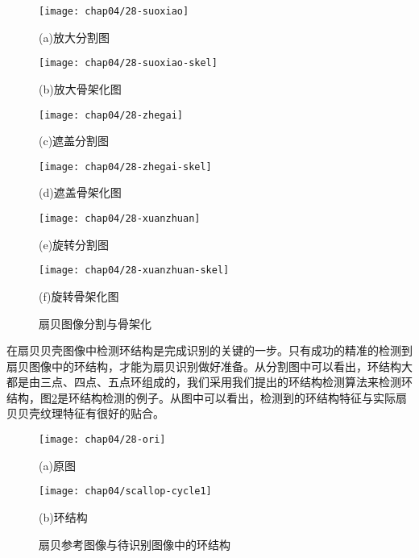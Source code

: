 \begin{figure}
\centering
  \begin{minipage}[b]{0.48\textwidth} 
      \centering 
      \texttt{[image: chap04/28-suoxiao]}
        \centerline{(a)放大分割图}\medskip
    \end{minipage}
  \begin{minipage}[b]{0.48\textwidth}
    \centering
    \texttt{[image: chap04/28-suoxiao-skel]}
      \centerline{(b)放大骨架化图}\medskip
    \end{minipage}
  \begin{minipage}[b]{0.48\textwidth} 
      \centering 
      \texttt{[image: chap04/28-zhegai]}
        \centerline{(c)遮盖分割图}\medskip
    \end{minipage}
  \begin{minipage}[b]{0.48\textwidth}
    \centering
    \texttt{[image: chap04/28-zhegai-skel]}
      \centerline{(d)遮盖骨架化图}\medskip
  \end{minipage}
  \begin{minipage}[b]{0.48\textwidth} 
      \centering 
      \texttt{[image: chap04/28-xuanzhuan]}
        \centerline{(e)旋转分割图}\medskip
    \end{minipage}
  \begin{minipage}[b]{0.48\textwidth}
    \centering
    \texttt{[image: chap04/28-xuanzhuan-skel]}
      \centerline{(f)旋转骨架化图}\medskip
  \end{minipage}
\caption{扇贝图像分割与骨架化}
\label{fig:seg-skel}
\end{figure}

在扇贝贝壳图像中检测环结构是完成识别的关键的一步。只有成功的精准的检测到扇贝图像中的环结构，才能为扇贝识别做好准备。从分割图中可以看出，环结构大都是由三点、四点、五点环组成的，我们采用我们提出的环结构检测算法来检测环结构，图\ref{fig:scallop-cycle}是环结构检测的例子。从图中可以看出，检测到的环结构特征与实际扇贝贝壳纹理特征有很好的贴合。

\begin{figure}
\centering
  \begin{minipage}[b]{0.48\textwidth} 
      \centering 
      \texttt{[image: chap04/28-ori]}
        \centerline{(a)原图}\medskip
    \end{minipage}
  \begin{minipage}[b]{0.48\textwidth}
    \centering
    \texttt{[image: chap04/scallop-cycle1]}
      \centerline{(b)环结构}\medskip
    \end{minipage}
\caption{扇贝参考图像与待识别图像中的环结构}
\label{fig:scallop-cycle}
\end{figure}


